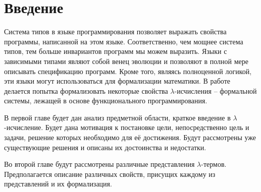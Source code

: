 \section*{Введение}

Система типов в языке программирования позволяет выражать свойства программы, написанной на этом языке. Соответственно, чем мощнее система типов, тем больше инвариантов программ мы можем выразить. Языки с зависимыми типами являют собой венец эволюции и позволяют в полной мере описывать спецификацию программ. Кроме того, являясь полноценной логикой, эти языки могут использоваться для формализации математики. В работе делается попытка формализовать некоторые свойства $\lambda$-исчисления -- формальной системы, лежащей в основе функционального программирования.

В первой главе будет дан анализ предметной области, краткое введение в $\lambda$-исчисление. Будет дана мотивация к постановке цели, непосредственно цель и задачи, решение которых необходимо для её достижения. Будут рассмотрены уже существующие решения и описаны их достоинства и недостатки.

Во второй главе будут рассмотрены различные представления $\lambda$-термов. Предполагается описание различных свойств, присущих каждому из представлений и их формализация.
